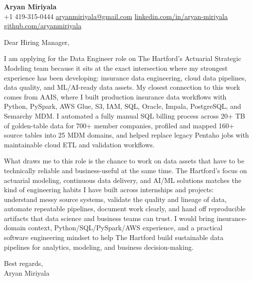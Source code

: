 \documentclass[letterpaper,11pt]{article}
\begin{document}
\begin{center}
    {\Large \textbf{Aryan Miriyala}}\\
    \vspace{2pt}
    +1 419-315-0444 \textbar{} \href{mailto:aryanmiriyala@gmail.com}{aryanmiriyala@gmail.com} \textbar{} \href{https://www.linkedin.com/in/aryan-miriyala-7788a21b6/}{linkedin.com/in/aryan-miriyala} \textbar{} \href{https://github.com/aryanmiriyala}{github.com/aryanmiriyala}
\end{center}

\vspace{10pt}

Dear Hiring Manager,

I am applying for the Data Engineer role on The Hartford's Actuarial Strategic Modeling team because it sits at the exact intersection where my strongest experience has been developing: insurance data engineering, cloud data pipelines, data quality, and ML/AI-ready data assets. My closest connection to this work comes from AAIS, where I built production insurance data workflows with Python, PySpark, AWS Glue, S3, IAM, SQL, Oracle, Impala, PostgreSQL, and Semarchy MDM. I automated a fully manual SQL billing process across 20+ TB of golden-table data for 700+ member companies, profiled and mapped 160+ source tables into 25 MDM domains, and helped replace legacy Pentaho jobs with maintainable cloud ETL and validation workflows.

What draws me to this role is the chance to work on data assets that have to be technically reliable and business-useful at the same time. The Hartford's focus on actuarial modeling, continuous data delivery, and AI/ML solutions matches the kind of engineering habits I have built across internships and projects: understand messy source systems, validate the quality and lineage of data, automate repeatable pipelines, document work clearly, and hand off reproducible artifacts that data science and business teams can trust. I would bring insurance-domain context, Python/SQL/PySpark/AWS experience, and a practical software engineering mindset to help The Hartford build sustainable data pipelines for analytics, modeling, and business decision-making.

\vspace{8pt}

Best regards,\\
Aryan Miriyala
\end{document}
